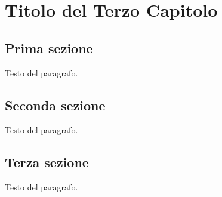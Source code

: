 \chapter{Titolo del Terzo Capitolo}
\vspace{4cm}


\section{Prima sezione}
Testo del paragrafo.

\section{Seconda sezione}
Testo del paragrafo.

\section{Terza sezione}
Testo del paragrafo.




